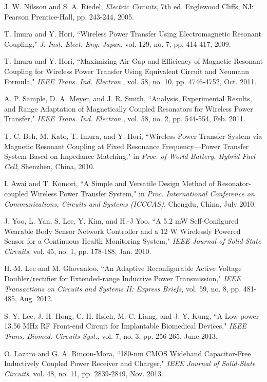 \documentclass[twocolumn,10pt]{IEEEtran}
\begin{document}
\begin{thebibliography}{99}
J. W. Nilsson and S. A. Riedel, \emph{Electric Circuits}, 7th ed. Englewood Cliffs, NJ: Pearson Prentice-Hall, pp. 243-244, 2005.

T. Imura and Y. Hori, ``Wireless Power Transfer Using Electromagnetic Resonant Coupling," \emph{J. Inst. Elect. Eng. Japan}, vol. 129, no. 7,  pp. 414-417, 2009.

T. Imura and Y. Hori, ``Maximizing Air Gap and Efficiency of Magnetic Resonant Coupling for Wireless Power Transfer Using Equivalent Circuit and Neumann Formula," \emph{IEEE Trans. Ind. Electron.}, vol. 58, no. 10, pp. 4746-4752, Oct. 2011.


A. P. Sample, D. A. Meyer, and J. R. Smith, ``Analysis, Experimental
Results, and Range Adaptation of Magnetically Coupled Resonators for
Wireless Power Transfer," \emph{IEEE Trans. Ind. Electron.}, vol. 58, no. 2,
pp. 544-554, Feb. 2011.

T. C. Beh, M. Kato, T. Imura, and Y. Hori, ``Wireless Power
Transfer System via Magnetic Resonant Coupling at Fixed Resonance
Frequency—Power Transfer System Based on Impedance Matching," in
\emph{Proc. of World Battery, Hybrid Fuel Cell}, Shenzhen, China,
2010.

I. Awai and T. Komori, ``A Simple and Versatile Design Method of
Resonator-coupled Wireless Power Transfer System," in \emph{Proc. International Conference on Communications, Circuits and Systems (ICCCAS)}, Chengdu, China, July 2010.

J. Yoo, L. Yan, S. Lee, Y. Kim, and H.-J Yoo, ``A 5.2 mW Self-Configured Wearable Body Sensor Network Controller and a 12  W Wirelessly Powered Sensor for a Continuous Health Monitoring System," \emph{IEEE Journal of  Solid-State Circuits}, vol. 45, no. 1,  pp. 178-188,  Jan.
2010.

H.-M. Lee and M. Ghovanloo, ``An Adaptive Reconfigurable Active Voltage Doubler/rectifier for Extended-range Inductive Power Transmission," \emph{IEEE Transactions on Circuits and Systems II: Express Briefs}, vol. 59, no. 8, pp. 481-485, Aug. 2012.

S.-Y. Lee, J.-H. Hong, C.-H. Hsieh, M.-C. Liang, and J.-Y. Kung, ``A Low-power 13.56 MHz RF Front-end Circuit for Implantable  Biomedical Devices," \emph{IEEE Trans. Biomed. Circuits Syst.}, vol. 7, no. 3, pp. 256-265, June 2013.

O. Lazaro and G. A. Rincon-Mora, ``180-nm CMOS Wideband Capacitor-Free Inductively Coupled Power Receiver and Charger," \emph{IEEE Journal of 
Solid-State Circuits}, vol.	48, no. 11, pp. 2839-2849, Nov. 2013.
 

\end{thebibliography}
\end{document}
